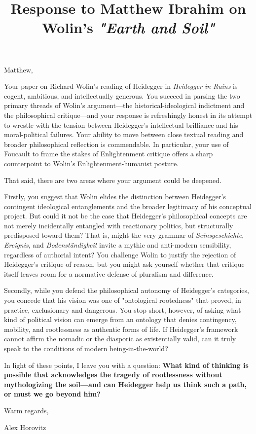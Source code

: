 \documentclass[11pt]{article}
\title{Response to Matthew Ibrahim on Wolin's \textit{"Earth and Soil"}}
\author{}
\date{}
\begin{document}
\maketitle

Matthew,

Your paper on Richard Wolin's reading of Heidegger in \textit{Heidegger in Ruins} is cogent, ambitious, and intellectually generous. You succeed in parsing the two primary threads of Wolin's argument—the historical-ideological indictment and the philosophical critique—and your response is refreshingly honest in its attempt to wrestle with the tension between Heidegger's intellectual brilliance and his moral-political failures. Your ability to move between close textual reading and broader philosophical reflection is commendable. In particular, your use of Foucault to frame the stakes of Enlightenment critique offers a sharp counterpoint to Wolin's Enlightenment-humanist posture.

That said, there are two areas where your argument could be deepened. 

Firstly, you suggest that Wolin elides the distinction between Heidegger's contingent ideological entanglements and the broader legitimacy of his conceptual project. But could it not be the case that Heidegger's philosophical concepts are not merely incidentally entangled with reactionary politics, but structurally predisposed toward them? That is, might the very grammar of \textit{Seinsgeschichte}, \textit{Ereignis}, and \textit{Bodenst\"andigkeit} invite a mythic and anti-modern sensibility, regardless of authorial intent? You challenge Wolin to justify the rejection of Heidegger's critique of reason, but you might ask yourself whether that critique itself leaves room for a normative defense of pluralism and difference.

Secondly, while you defend the philosophical autonomy of Heidegger's categories, you concede that his vision was one of "ontological rootedness" that proved, in practice, exclusionary and dangerous. You stop short, however, of asking what kind of political vision can emerge from an ontology that denies contingency, mobility, and rootlessness as authentic forms of life. If Heidegger's framework cannot affirm the nomadic or the diasporic as existentially valid, can it truly speak to the conditions of modern being-in-the-world?

In light of these points, I leave you with a question: \textbf{What kind of thinking is possible that acknowledges the tragedy of rootlessness without mythologizing the soil—and can Heidegger help us think such a path, or must we go beyond him?}

Warm regards,

Alex Horovitz
\end{document}
